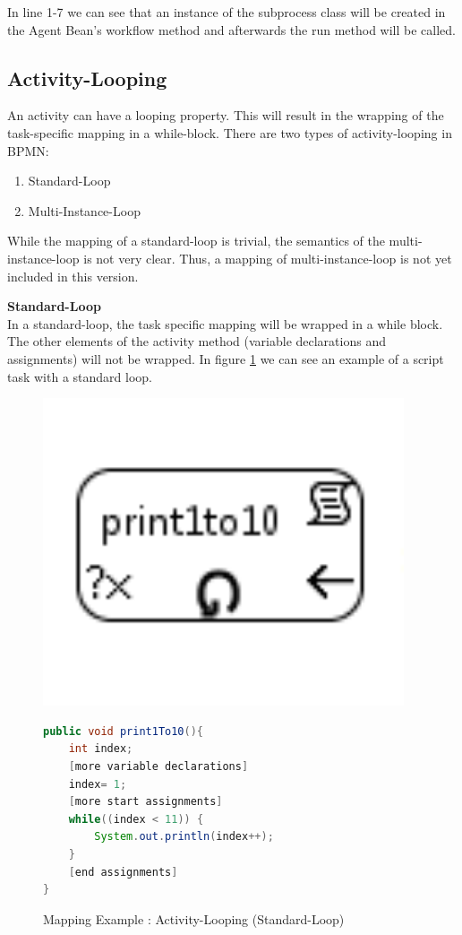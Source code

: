 In line 1-7 we can see that an instance of the subprocess class will be created in the Agent Bean's workflow method and afterwards the run method will be called.
\subsection{Activity-Looping}
An activity can have a looping property. This will result in the wrapping of the task-specific mapping in a while-block. 
There are two types of activity-looping in BPMN:
\begin{enumerate}
	\item Standard-Loop
	\item Multi-Instance-Loop
\end{enumerate}
While the mapping of a standard-loop is trivial, the semantics of the multi-instance-loop is not very clear. Thus, a mapping of multi-instance-loop is not yet included in this version.
 
\textbf{Standard-Loop}\\
In a standard-loop, the task specific mapping will be wrapped in a while block. The other elements of the activity method (variable declarations and assignments) will not be wrapped.  In figure \ref{fig:mapping_standardLoop} we can see an example of a script task with a standard loop.
\begin{figure}[h]
\begin{minipage}[c]{0.3\textwidth}
\includegraphics[width=0.95\textwidth]{images/mapping/standard_loop.png}
\end{minipage}
\begin{minipage}[c]{0.7\textwidth}
\begin{lstlisting}[language=Java]
public void print1To10(){
	int index;
	[more variable declarations]
	index= 1;
	[more start assignments]
	while((index < 11)) {
		System.out.println(index++);
	}
	[end assignments]
}
\end{lstlisting}
\end{minipage}
\caption{Mapping Example : Activity-Looping (Standard-Loop)}%
\label{fig:mapping_standardLoop}%
\end{figure}
